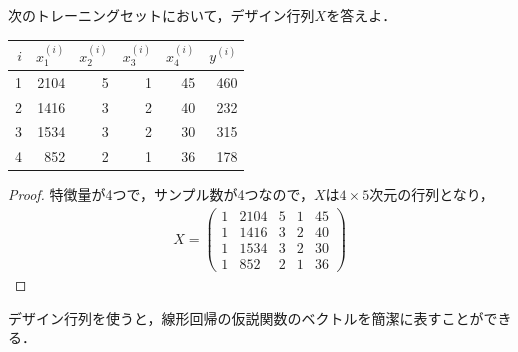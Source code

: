 \begin{qu}
次のトレーニングセットにおいて，デザイン行列$X$を答えよ．
\begin{table}[h]
\centering
\begin{tabular}{rrrrrr}
\hline
$i$ &$x_1^{(i)}$ &$x_2^{(i)}$ &$x_3^{(i)}$ &$x_4^{(i)}$ & $y^{(i)}$ \\ \hline
1 & 2104 & 5 & 1 & 45 & 460 \\
2 & 1416 & 3 & 2 & 40 & 232 \\
3 & 1534 & 3 & 2 & 30 & 315 \\
4 & 852  & 2 & 1 & 36 & 178 \\ \hline
\end{tabular}
\end{table}
\end{qu}
\begin{proof}
特徴量が4つで，サンプル数が4つなので，$X$は$4\times 5$次元の行列となり，
\begin{align*}
X=
\left(
\begin{array}{ccccc}
1 & 2104 & 5 & 1 & 45 \\
1 & 1416 & 3 & 2 & 40 \\
1 & 1534 & 3 & 2 & 30 \\
1 & 852  & 2 & 1 & 36 
\end{array}
\right)
\end{align*}
\end{proof}

デザイン行列を使うと，線形回帰の仮説関数のベクトルを簡潔に表すことができる．

